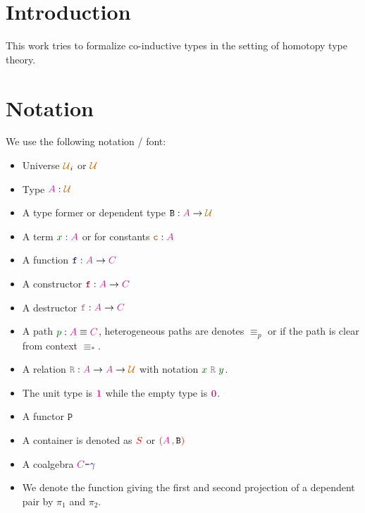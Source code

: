 \documentclass[twoside,11pt,openright]{report}
\theoremstyle{plain} %
\theoremstyle{definition}
\theoremstyle{remark}
\newcommand*{\term}[1]{\textcolor{green!30!black}{#1}} %
\newcommand*{\pathterm}[1]{\textcolor{green!40!black}{#1}}
\newcommand*{\type}[1]{\textcolor{magenta!90!black}{#1}}
\newcommand*{\container}[1]{\textcolor{red}{#1}}
\newcommand*{\containerpair}[2]{\textcolor{red}{(}#1\,\textcolor{red}{,}\,#2\textcolor{red}{)}}
\newcommand*{\universe}[1]{\textcolor{orange!80!black}{#1}}
\newcommand*{\unit}{\type{\textbf{1}}}
\newcommand*{\empt}{\type{\textbf{0}}}
\newcommand*{\coalg}[2]{#1\texttt{-}#2}
\newcommand*{\relation}[1]{\textcolor{gray}{\ensuremath{\mathtt{#1}}}}
\newcommand*{\constant}[1]{\textcolor{orange!60!black}{\ensuremath{\mathtt{#1}}}}
\newcommand*{\function}[1]{\textcolor{blue!60!black}{\ensuremath{\mathtt{#1}}}}
\newcommand*{\constructor}[1]{\textcolor{purple!60!black}{\ensuremath{\mathtt{#1}}}}
\newcommand*{\destructor}[1]{\textcolor{pink!60!black}{\ensuremath{\mathtt{#1}}}}
\newcommand*{\typeformer}[1]{\ensuremath{\mathtt{#1}}}
\newcommand*{\functor}[1]{\ensuremath{\mathbf{\mathtt{#1}}}}
\begin{document}
\chapter{Introduction} %
\label{ch:intro}
This work tries to formalize co-inductive types in the setting of homotopy type theory.




\chapter{Notation}
We use the following notation / font:
\begin{itemize}
\item Universe \(\universe{\mathcal{U}}_i\) or \(\universe{\mathcal{U}}\)
\item Type \(\type{A} : \universe{\mathcal{U}}\)
\item A type former or dependent type \(\typeformer{B} : \type{A} \rightarrow \universe{\mathcal{U}}\)
\item A term \(\term{x} : \type{A}\) or for constants \(\constant{c} : \type{A}\)
\item A function \(\function{f} : \type{A} \rightarrow \type{C}\)
\item A constructor \(\constructor{f} : \type{A} \rightarrow \type{C}\) 
\item A destructor \(\destructor{f} : \type{A} \rightarrow \type{C}\) 
\item A path \(\pathterm{p} : \type{A} \equiv \type{C}\), heterogeneous paths are denotes \(\equiv_p\) or if the path is clear from context \(\equiv_*\).
\item A relation \(\relation{R} : \type{A} \rightarrow \type{A} \rightarrow \universe{\mathcal{U}}\) with notation \(\term{x}~\relation{R}~\term{y}\).
\item The unit type is \(\unit\) while the empty type is \(\empt\).
\item A functor \(\functor{P}\)
\item A container is denoted as \(\container{S}\) or \(\containerpair{\type{A}}{\typeformer{B}}\)
\item A coalgebra \(\coalg{\type{C}}{\function{\gamma}}\)
\item We denote the function giving the first and second projection of a dependent pair by \(\pi_1\) and \(\pi_2\).
\end{itemize}
\end{document}
